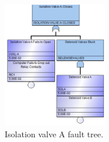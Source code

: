 \begin{figure}[H]
    \centering
    \includegraphics[width=0.4\textwidth]{3_identifying_gaps/benchmarking/datasets/figures/isolation_valve_a_fault_tree.png}
    \caption{Isolation valve A fault tree.}
    \label{fig:isolation_valve_a_fault_tree}
\end{figure}